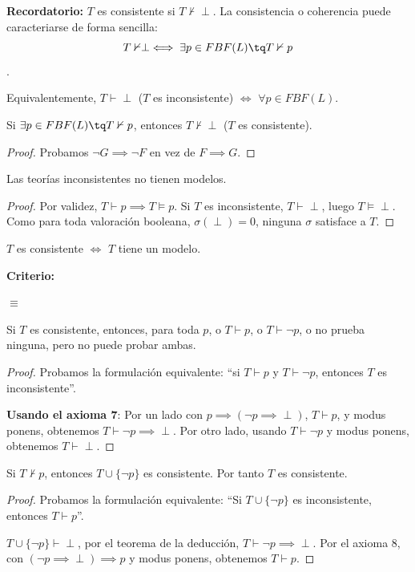 \textbf{Recordatorio: } $T$ es consistente si $T\nvdash \perp$. La consistencia o coherencia puede caracteriarse de forma sencilla:
$$T\nvdash\perp \iff \exists p\in FBF(L)\tq T\nvdash p$$.

Equivalentemente, $T\vdash\perp$ ($T$ es inconsistente) $\iff$ $\forall p\in FBF(L)$.

\begin{theorem}
	Si $\exists p\in FBF(L) \tq T\nvdash p$, entonces $T\nvdash \perp$ ($T$ es consistente).
\end{theorem}
\begin{proof}
	Probamos $\neg G\implies \neg F$ en vez de $F\implies G$.
\end{proof}

\begin{corol}
	Las teorías inconsistentes no tienen modelos.
\end{corol}
\begin{proof}
	Por validez, $T\vdash p \implies T\vDash p$. Si $T$ es inconsistente, $T\vdash \perp$, luego $T\vDash\perp$. Como para toda valoración booleana, $\sigma(\perp) = 0$, ninguna $\sigma$ satisface a $T$.
\end{proof}

\begin{theorem}
	$T$ es consistente $\iff$ $T$ tiene un modelo.
\end{theorem}


\noindent\textbf{Criterio: }\mbox{}

	 $\equiv$ 


\begin{theorem}
	Si $T$ es consistente, entonces, para toda $p$, o $T\vdash p$, o $T\vdash \neg p$, o no prueba ninguna, pero no puede probar ambas.
\end{theorem}
\begin{proof}\mbox{}
	
	Probamos la formulación equivalente: ``si $T\vdash p$ y $T\vdash \neg p$, entonces $T$ es inconsistente''.
	
	\textbf{Usando el axioma 7}: 
	Por un lado con $p\implies(\neg p \implies \perp)$, $T\vdash p$, y modus ponens, obtenemos $T\vdash \neg p \implies \perp$. Por otro lado, usando $T\vdash \neg p$ y modus ponens, obtenemos $T\vdash\perp$.
\end{proof}

\begin{theorem}
	Si $T \nvdash p$, entonces $T\cup \{\neg p\}$ es consistente. Por tanto $T$ es consistente.
\end{theorem}
\begin{proof}\mbox{}
	
	Probamos la formulación equivalente:  ``Si $T\cup \{\neg p\}$ es inconsistente, entonces $T\vdash p$''.
	
	$T\cup \{\neg p\}\vdash \perp$, por el teorema de la deducción, $T\vdash \neg p\implies \perp$. Por el axioma 8, con $(\neg p \implies \perp)\implies p$ y modus ponens, obtenemos $T\vdash p$.
\end{proof}

